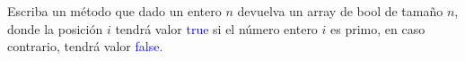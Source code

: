 Escriba un método que dado un entero \(n\) devuelva un array de bool de tamaño \(n\), donde la posición \(i\) tendrá valor \textcolor{blue}{true} si el número entero \(i\) es primo, en caso contrario, tendrá valor  \textcolor{blue}{false}. 
